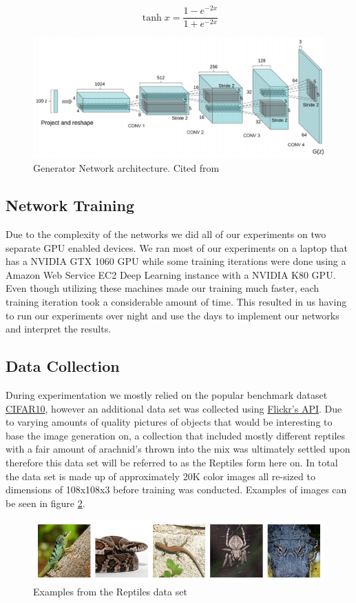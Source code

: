 \begin{equation}
\label{tanh-equation}
\tanh x = \frac{1 - e^{-2x}}{1 + e^{-2x}}
\end{equation}

\begin{figure}[h]
\centering
\includegraphics[width=\textwidth]{figures/DCGAN.png}
\caption{Generator Network architecture. Cited from \cite{DBLP:journals/corr/RadfordMC15} }
\label{fig:architecture}
\end{figure}

\subsection{Network Training}
Due to the complexity of the networks we did all of our experiments on two separate GPU enabled devices. We ran most of our experiments on a laptop that has a NVIDIA GTX 1060 GPU while some training iterations were done using a Amazon Web Service EC2 Deep Learning instance with a NVIDIA K80 GPU. Even though utilizing these machines made our training much faster, each training iteration took a considerable amount of time. This resulted in us having to run our experiments over night and use the days to implement our networks and interpret the results. 

\subsection{Data Collection}

During experimentation we mostly relied on the popular benchmark dataset \href{https://www.cs.toronto.edu/~kriz/cifar.html}{CIFAR10}, however an additional data set was collected using \href{https://www.flickr.com/services/api/}{Flickr's API}. Due to varying amounts of quality pictures of objects that would be interesting to base the image generation on, a collection that included mostly different reptiles with a fair amount of arachnid's thrown into the mix was ultimately settled upon therefore this data set will be referred to as the Reptiles form here on. In total the data set is made up of approximately 20K color images all re-sized to dimensions of 108x108x3 before training was conducted. Examples of images can be seen in figure \ref{fig:reptiles}.


\begin{figure}[H]
\centering
\includegraphics[width=\textwidth]{figures/reptiles.png}
\caption{Examples from the Reptiles data set}
\label{fig:reptiles}
\end{figure}
